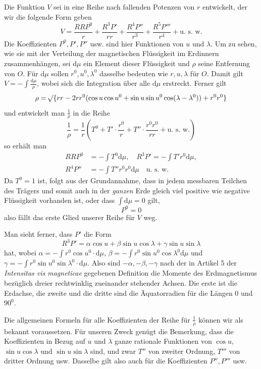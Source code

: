 Die Funktion $V$ sei in eine Reihe nach fallenden Potenzen von $r$ entwickelt, der wir die folgende Form geben
\[
V=\frac{RRP^0}{r}+\frac{R^3P'}{rr}+\frac{R^4P''}{r^3}+\frac{R^5P'''}{r^4}+\text{u. s. w.}
\]
Die Koeffizienten $P^0,P',P''$ usw. sind hier Funktionen von $u$ und $\lambda$. Um zu sehen, wie sie mit der Verteilung der magnetischen Flüssigkeit im Erdinnern zusammenhängen, sei $\mathrm{d}\mu$ ein Element dieser Flüssigkeit und $\rho$ seine Entfernung von $O$. Für $\mathrm{d}\mu$ sollen $r^0,u^0,\lambda^0$ dasselbe bedeuten wie $r,u,\lambda$ für $O$. Damit gilt $V=-\int\frac{\mathrm{d}\mu}{\rho}$, wobei sich die Integration über alle $\mathrm{d}\mu$ erstreckt. Ferner gilt
\[
\rho=\mathord{{}^{}\!\surd}\{rr-2rr^0(\cos u\cos u^0+\sin u\sin u^0\cos(\lambda-\lambda^0))+r^0r^0\}
\]
und entwickelt man $\frac1\rho$ in die Reihe
\[
\frac1\rho=\frac1r(T^0+T'\cdot\frac{r^0}{r}+T''\cdot\frac{r^0r^0}{rr}+\text{u. s. w.})
\]
so erhält man
\[
\begin{aligned}RRP^0&=-\int T^0\mathrm{d}\mu,\quad R^3P'=-\int T'r^0\mathrm{d}\mu,\\R^4P''&=-\int T''r^0r^0\mathrm{d}\mu\quad\text{u. s. w.}\end{aligned}
\]
Da $T^0=1$ ist, folgt aus der Grundannahme, dass in jedem messbaren Teilchen des Trägers und somit auch in der \textit{ganzen} Erde gleich viel positive wie negative Flüssigkeit vorhanden ist, oder dass $\int\mathrm{d}\mu=0$ gilt,
\[
P^0=0
\]
also fällt das erste Glied unserer Reihe für $V$ weg.

Man sieht ferner, dass $P'$ die Form
\[
R^3P'=\alpha\cos u+\beta\sin u\cos\lambda+\gamma\sin u\sin\lambda
\]
hat, wobei $\alpha=-\int r^0\cos u^0\cdot\mathrm{d}\mu$, $\beta=-\int r^0\sin u^0\cos\lambda^0\mathrm{d}\mu$ und $\gamma=-\int r^0\sin u^0\sin\lambda^0\cdot\mathrm{d}\mu$. Also sind $-\alpha,-\beta,-\gamma$ nach der in Artikel 5 der \textit{Intensitas vis magneticae} gegebenen Definition die Momente des Erdmagnetismus bezüglich dreier rechtwinklig zueinander stehender Achsen. Die erste ist die Erdachse, die zweite und die dritte sind die Äquatorradien für die Längen $0$ und $90^0$.

Die allgemeinen Formeln für alle Koeffizienten der Reihe für $\frac1\rho$ können wir als bekannt voraussetzen. Für unseren Zweck genügt die Bemerkung, dass die Koeffizienten in Bezug auf $u$ und $\lambda$ ganze rationale Funktionen von $\cos u$, $\sin u\cos\lambda$ und $\sin u\sin\lambda$ sind, und zwar $T''$ von zweiter Ordnung, $T'''$ von dritter Ordnung usw. Dasselbe gilt also auch für die Koeffizienten $P'',P'''$ usw.

